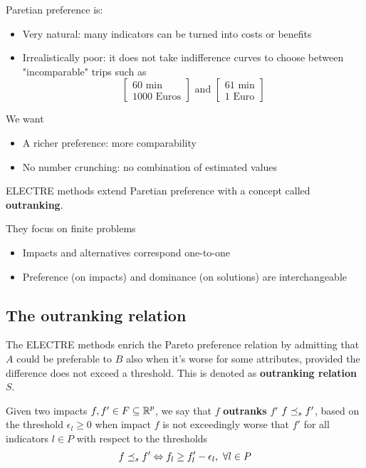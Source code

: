 Paretian preference is: 
\begin{itemize}
	\item Very natural: many indicators can be turned into costs or benefits
	
	\item Irrealistically poor: it does not take indifference curves to choose between "incomparable" trips such as 
	$$ 
	\left[\begin{array}{c}
		60 \text{ min} \\ 1000 \text{ Euros}
	\end{array}\right]
	\text{ and }
	\left[\begin{array}{c}
		61 \text{ min} \\ 1 \text{ Euro}
	\end{array}\right]
	$$
\end{itemize}

We want
\begin{itemize}
	\item A richer preference: more comparability
	
	\item No number crunching: no combination of estimated values
\end{itemize}

ELECTRE methods extend Paretian preference with a concept called \textbf{outranking}.

They focus on finite problems
\begin{itemize}
	\item Impacts and alternatives correspond one-to-one
	
	\item Preference (on impacts) and dominance (on solutions) are interchangeable
\end{itemize}

\subsection{The outranking relation}

The ELECTRE methods enrich the Pareto preference relation by admitting that $A$ could be preferable to $B$ also when it's worse for some attributes, provided the difference does not exceed a threshold. This is denoted as \textbf{outranking relation} $S$. \\

\begin{definition}
	Given two impacts $f, f' \in F \subseteq \operatorname{\mathbb{R}}^p$, we say that $f$ \textbf{outranks} $f'$ $f \preceq_{s} f'$, based on the threshold $\epsilon_l \geq 0$ when impact $f$ is not exceedingly worse that $f'$ for all indicators $l \in P$ with respect to the thresholds
	$$ f \preceq_{s} f' \Leftrightarrow f_l \geq f_l' - \epsilon_l, \ \forall l \in P $$
\end{definition}

